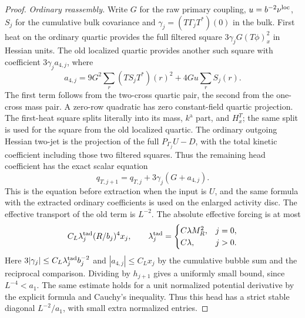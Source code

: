 \documentclass[11pt]{article}
\theoremstyle{definition}
\begin{document}
\begin{proof}
\emph{Ordinary reassembly.}
Write \(G\) for the raw primary coupling, \(u=b^{-2}\nu^{\rm loc}\),
\(S_j\) for the cumulative bulk covariance and
\(\gamma_j=(T\Gamma_jT^*)(0)\) in the bulk. First heat on the
ordinary quartic provides the full filtered square
\(3\gamma_jG(T\phi)_x^2\) in Hessian units. The old localized quartic
provides another such square with coefficient \(3\gamma_j a_{4,j}\),
where
\begin{equation}
 a_{4,j}=9G^2\sum_r (TS_jT^*)(r)^2+4Gu\sum_r S_j(r).
\end{equation}
The first term follows from the two-cross quartic pair, the second
from the one-cross mass pair. A zero-row quadratic has zero
constant-field quartic projection. The first-heat square splits
literally into its mass, \(k^{\mathrm a}\) part, and \(H_x^T\);
the same split is used for the square from the old localized
quartic. The ordinary outgoing Hessian two-jet is the projection
of the full \(P_{\Gamma_j}U-D\), with the total kinetic coefficient
including those two filtered squares. Thus the remaining head
coefficient has the exact scalar equation
\begin{equation}
 q_{T,j+1}=q_{T,j}+3\gamma_j(G+a_{4,j}).
\end{equation}
This is the equation before extraction when the input is \(U\),
and the same formula with the extracted ordinary coefficients
is used on the enlarged activity disc. The effective transport of
the old term is \(L^{-2}\). The absolute effective forcing is at most
\begin{equation}
 C_L\lambda^{\rm tad}_j (R/b_j)^4x_j,\qquad
 \lambda^{\rm tad}_j=
 \begin{cases}C\lambda M_R^2,&j=0,\\C\lambda,&j>0.\end{cases}
\end{equation}
Here \(3|\gamma_j|\le C_L\lambda^{\rm tad}_j b_j^{-2}\) and
\(|a_{4,j}|\le C_Lx_j\) by the cumulative bubble sum and the
reciprocal comparison. Dividing by \(h_{j+1}\) gives a uniformly
small bound, since \(L^{-4}<a_1\). The same estimate holds for
a unit normalized potential derivative by the explicit formula
and Cauchy's inequality. Thus this head has a strict stable
diagonal \(L^{-2}/a_1\), with small extra normalized entries.


\end{proof}
\end{document}
